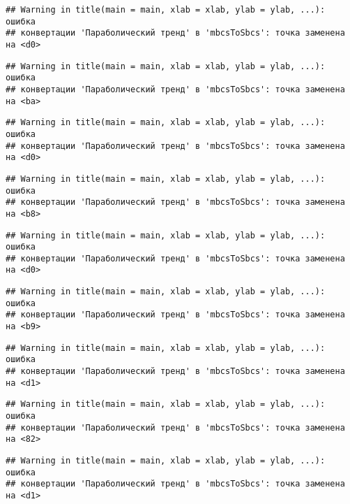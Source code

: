 \documentclass[
]{article}
\begin{document}
\begin{verbatim}
## Warning in title(main = main, xlab = xlab, ylab = ylab, ...): ошибка
## конвертации 'Параболический тренд' в 'mbcsToSbcs': точка заменена на <d0>
\end{verbatim}

\begin{verbatim}
## Warning in title(main = main, xlab = xlab, ylab = ylab, ...): ошибка
## конвертации 'Параболический тренд' в 'mbcsToSbcs': точка заменена на <ba>
\end{verbatim}

\begin{verbatim}
## Warning in title(main = main, xlab = xlab, ylab = ylab, ...): ошибка
## конвертации 'Параболический тренд' в 'mbcsToSbcs': точка заменена на <d0>
\end{verbatim}

\begin{verbatim}
## Warning in title(main = main, xlab = xlab, ylab = ylab, ...): ошибка
## конвертации 'Параболический тренд' в 'mbcsToSbcs': точка заменена на <b8>
\end{verbatim}

\begin{verbatim}
## Warning in title(main = main, xlab = xlab, ylab = ylab, ...): ошибка
## конвертации 'Параболический тренд' в 'mbcsToSbcs': точка заменена на <d0>
\end{verbatim}

\begin{verbatim}
## Warning in title(main = main, xlab = xlab, ylab = ylab, ...): ошибка
## конвертации 'Параболический тренд' в 'mbcsToSbcs': точка заменена на <b9>
\end{verbatim}

\begin{verbatim}
## Warning in title(main = main, xlab = xlab, ylab = ylab, ...): ошибка
## конвертации 'Параболический тренд' в 'mbcsToSbcs': точка заменена на <d1>
\end{verbatim}

\begin{verbatim}
## Warning in title(main = main, xlab = xlab, ylab = ylab, ...): ошибка
## конвертации 'Параболический тренд' в 'mbcsToSbcs': точка заменена на <82>
\end{verbatim}

\begin{verbatim}
## Warning in title(main = main, xlab = xlab, ylab = ylab, ...): ошибка
## конвертации 'Параболический тренд' в 'mbcsToSbcs': точка заменена на <d1>
\end{verbatim}
\end{document}

